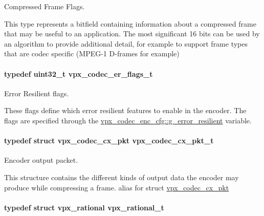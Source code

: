\-Compressed \-Frame \-Flags. 

\-This type represents a bitfield containing information about a compressed frame that may be useful to an application. \-The most significant 16 bits can be used by an algorithm to provide additional detail, for example to support frame types that are codec specific (\-M\-P\-E\-G-\/1 \-D-\/frames for example) \hypertarget{group__encoder_ga77e0e1fff62556a4f4d54c84467a41f3}{
\paragraph[{vpx\-\_\-codec\-\_\-er\-\_\-flags\-\_\-t}]{\setlength{\rightskip}{0pt plus 5cm}typedef uint32\-\_\-t {\bf vpx\-\_\-codec\-\_\-er\-\_\-flags\-\_\-t}}}
\label{group__encoder_ga77e0e1fff62556a4f4d54c84467a41f3}


\-Error \-Resilient flags. 

\-These flags define which error resilient features to enable in the encoder. \-The flags are specified through the \hyperlink{structvpx__codec__enc__cfg_a4e17173b66ca0d7dfba9978625d7ba76}{vpx\-\_\-codec\-\_\-enc\-\_\-cfg\-::g\-\_\-error\-\_\-resilient} variable. \hypertarget{group__encoder_ga3f711e17fbefac545e8959ef5a023556}{
\paragraph[{vpx\-\_\-codec\-\_\-cx\-\_\-pkt\-\_\-t}]{\setlength{\rightskip}{0pt plus 5cm}typedef struct {\bf vpx\-\_\-codec\-\_\-cx\-\_\-pkt}  {\bf vpx\-\_\-codec\-\_\-cx\-\_\-pkt\-\_\-t}}}
\label{group__encoder_ga3f711e17fbefac545e8959ef5a023556}


\-Encoder output packet. 

\-This structure contains the different kinds of output data the encoder may produce while compressing a frame. alias for struct \hyperlink{structvpx__codec__cx__pkt}{vpx\-\_\-codec\-\_\-cx\-\_\-pkt} \hypertarget{group__encoder_ga2c08c6d71202024f17a5aef71a3d13e5}{
\paragraph[{vpx\-\_\-rational\-\_\-t}]{\setlength{\rightskip}{0pt plus 5cm}typedef struct {\bf vpx\-\_\-rational}  {\bf vpx\-\_\-rational\-\_\-t}}}
\label{group__encoder_ga2c08c6d71202024f17a5aef71a3d13e5}


